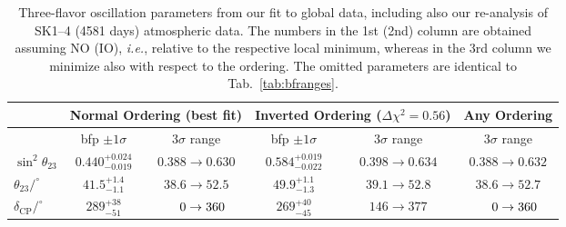 \documentclass[a4paper, 11pt]{article}
\begin{document}
\begin{table}\centering
  \begin{footnotesize}
    \begin{tabular}{l|cc|cc|c}
      \hline\hline
      & \multicolumn{2}{c|}{Normal Ordering (best fit)}
      & \multicolumn{2}{c|}{Inverted Ordering ($\Delta\chi^2=0.56$)}
      & Any Ordering
      \\
      \hline
      & bfp $\pm 1\sigma$ & $3\sigma$ range
      & bfp $\pm 1\sigma$ & $3\sigma$ range
      & $3\sigma$ range
      \\
      \hline
      \rule{0pt}{4mm}\ignorespaces
      $\sin^2\theta_{23}$
      & $0.440_{-0.019}^{+0.024}$ & $0.388 \to 0.630$
      & $0.584_{-0.022}^{+0.019}$ & $0.398 \to 0.634$
      & $0.388 \to 0.632$
      \\[1mm]
      $\theta_{23}/^\circ$
      & $41.5_{-1.1}^{+1.4}$ & $38.6 \to 52.5$
      & $49.9_{-1.3}^{+1.1}$ & $39.1 \to 52.8$
      & $38.6 \to 52.7$
      \\[3mm]
      $\delta_\text{CP}/^\circ$
      & $289_{-51}^{+38}$ & $\hphantom{00}0 \to 360$
      & $269_{-45}^{+40}$ & $146 \to 377$
      & $\hphantom{00}0 \to 360$
      \\[1mm]
      \hline\hline
    \end{tabular}
  \end{footnotesize}
  \caption{Three-flavor oscillation parameters from our fit to global
    data, including also our re-analysis of SK1--4 (4581 days)
    atmospheric data.  The numbers in the 1st (2nd) column are
    obtained assuming NO (IO), \textit{i.e.}, relative to the
    respective local minimum, whereas in the 3rd column we minimize
    also with respect to the ordering.  The omitted parameters are
    identical to Tab.~\ref{tab:bfranges}.}
  \label{tab:skranges}
\end{table}
\end{document}
